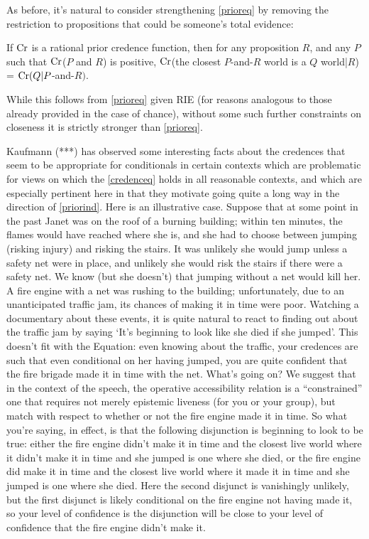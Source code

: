 \documentclass[If.tex]{subfiles}
\begin{document}
As before, it's natural to consider strengthening \ref{prioreq} by removing the restriction to propositions that could be someone's total evidence:
\begin{prop}
	 \label{priorind}
	If $\operatorname{Cr}$ is a rational prior credence function, then for any proposition $R$, and any $P$ such that $\operatorname{Cr}$($P$ and $R$) is positive, $\operatorname{Cr}$(the closest $P$-and-$R$ world is a $Q$ world|$R$) = $\operatorname{Cr}(Q|P$-and-$R)$. 
\end{prop}
While this follows from \ref{prioreq} given RIE (for reasons analogous to those already provided in the case of chance), without some such further constraints on closeness it is strictly stronger than \ref{prioreq}.  

Kaufmann (***) has observed some interesting facts about the credences that seem to be appropriate for conditionals in certain contexts which are problematic for views on which the \ref{credenceq} holds in all reasonable contexts, and which are especially pertinent here in that they motivate going quite a long way in the direction of \ref{priorind}.  Here is an illustrative case.  Suppose that at some point in the past Janet was on the roof of a burning building; within ten minutes, the flames would have reached where she is, and she had to choose between jumping (risking injury) and risking the stairs.  It was unlikely she would jump unless a safety net were in place, and unlikely she would risk the stairs if there were a safety net.  We know (but she doesn't) that jumping without a net would kill her.  A fire engine with a net was rushing to the building; unfortunately, due to an unanticipated traffic jam, its chances of making it in time were poor.  Watching a documentary about these events, it is quite natural to react to finding out about the traffic jam by saying ‘It's beginning to look like she died if she jumped’.  This doesn't fit with the Equation: even knowing about the traffic, your credences are such that even conditional on her having jumped, you are quite confident that the fire brigade made it in time with the net.  What's going on?  We suggest that in the context of the speech, the operative accessibility relation is a “constrained” one that requires not merely epistemic liveness (for you or your group), but match with respect to whether or not the fire engine made it in time.  So what you're saying, in effect, is that the following disjunction is beginning to look to be true: either the fire engine didn't make it in time and the closest live world where it didn't make it in time and she jumped is one where she died, or the fire engine did make it in time and the closest live world where it made it in time and she jumped is one where she died.  Here the second disjunct is vanishingly unlikely, but the first disjunct is likely conditional on the fire engine not having made it, so your level of confidence is the disjunction will be close to your level of confidence that the fire engine didn't make it.  
\end{document}
